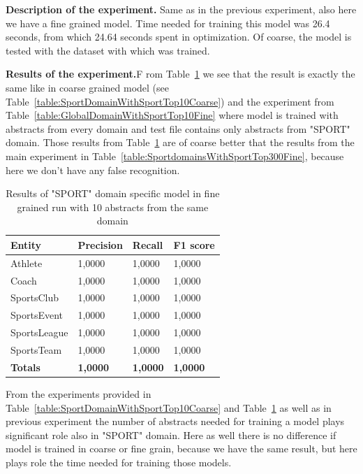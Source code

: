 \documentclass[thesis=M,english]{FITthesis}[2018/05/30]
\begin{document}
	\textbf{Description of the experiment.} Same as in the previous experiment, also here we have a fine grained model. Time needed for training this model was 26.4 seconds, from which 24.64 seconds spent in optimization. Of coarse, the model is tested with the dataset with which was trained.
	
	\textbf{Results of the experiment.}F rom Table~\ref{table:SportDomainWithSportTop10Fine} we see that the result is exactly the same like in coarse grained model (see Table~\ref{table:SportDomainWithSportTop10Coarse}) and the experiment from Table~\ref{table:GlobalDomainWithSportTop10Fine} where model is trained with abstracts from every domain and test file contains only abstracts from "SPORT" domain. Those results from Table~\ref{table:SportDomainWithSportTop10Fine} are of coarse better that the results from the main experiment in Table~\ref{table:SportdomainsWithSportTop300Fine}, because here we don't have any false recognition.
	 
	\begin{table}[H]\centering
		\begin{tabular}{|l|l|l|l|}
			\hline {\textbf{Entity}} & {\textbf{Precision}} & {\textbf{Recall}} & {\textbf{F1 score}}\\\hline
				Athlete & 1,0000 & 1,0000 & 1,0000\\
				Coach & 1,0000 & 1,0000 & 1,0000\\
				SportsClub & 1,0000 & 1,0000 & 1,0000\\
				SportsEvent & 1,0000 & 1,0000 & 1,0000\\
				SportsLeague & 1,0000 & 1,0000 & 1,0000\\
				SportsTeam & 1,0000 & 1,0000 & 1,0000\\\hline
				\textbf{Totals} & \textbf{1,0000} & \textbf{1,0000} & \textbf{1,0000}\\\hline
		\end{tabular}
		\caption{Results of "SPORT" domain specific model in fine grained run with 10 abstracts from the same domain \label{table:SportDomainWithSportTop10Fine}}
	\end{table}	

	From the experiments provided in Table~\ref{table:SportDomainWithSportTop10Coarse} and Table~\ref{table:SportDomainWithSportTop10Fine} as well as in previous experiment the number of abstracts needed for training a model plays significant role also in "SPORT" domain. Here as well there is no difference if model is trained in coarse or fine grain, because we have the same result, but here plays role the time needed for training those models.
	
\end{document}
